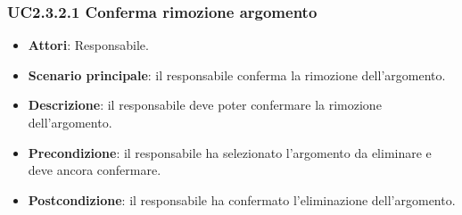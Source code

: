 \subsubsection{UC2.3.2.1 Conferma rimozione argomento}
\begin{itemize}
\item \textbf{Attori}: Responsabile.
\item \textbf{Scenario principale}: il responsabile conferma la rimozione dell'argomento.
\item \textbf{Descrizione}: il responsabile deve poter confermare la rimozione dell'argomento.
\item \textbf{Precondizione}: il responsabile ha selezionato l'argomento da eliminare e deve ancora confermare.
\item \textbf{Postcondizione}: il responsabile ha confermato l'eliminazione dell'argomento.
\end{itemize}
